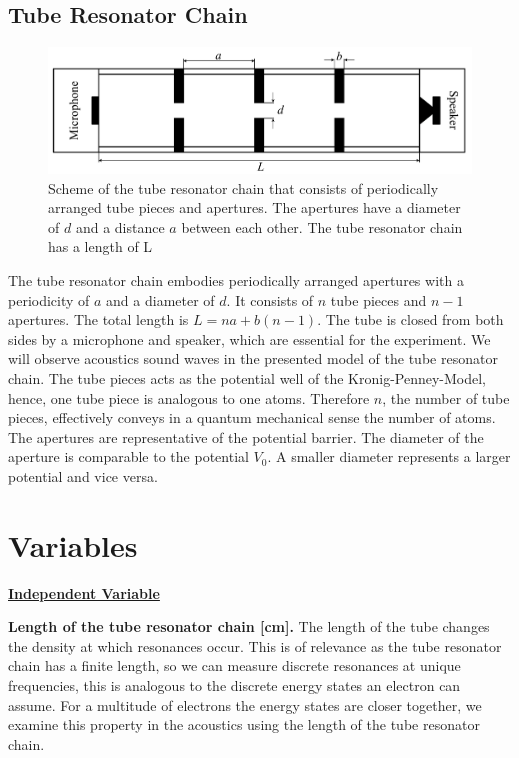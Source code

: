 \documentclass[12pt]{article}
\begin{document}
\subsection{Tube Resonator Chain}
\begin{figure}[hbt]
	\caption{Scheme of the tube resonator chain that consists of periodically arranged tube pieces and apertures. The apertures have a diameter of $d$ and a distance $a$ between each other. The tube resonator chain has a length of L}
	\includegraphics[width=\textwidth]{introduction/tube_resonator_chain.pdf}
\end{figure}
The tube resonator chain embodies periodically arranged apertures with a periodicity of $a$ and a diameter of $d$. It consists of $n$ tube pieces and $n-1$ apertures. The total length is $L=na + b(n-1)$. The tube is closed from both sides by a microphone and speaker, which are essential for the experiment. We will observe acoustics sound waves in the presented model of the tube resonator chain. The tube pieces acts as the potential well of the Kronig-Penney-Model, hence, one tube piece is analogous to one atoms. Therefore $n$, the number of tube pieces, effectively conveys in a quantum mechanical sense the number of atoms. The apertures are representative of the potential barrier. The diameter of the aperture is comparable to the potential $V_0$. A smaller diameter represents a larger potential and vice versa. 

\section{Variables}
\underline{\bf Independent Variable}

{\bf Length of the tube resonator chain [cm].} The length of the tube changes the density at which resonances occur. This is of relevance as the tube resonator chain has a finite length, so we can measure discrete resonances at unique frequencies, this is analogous to the discrete energy states an electron can assume. For a multitude of electrons the energy states are closer together, we examine this property in the acoustics using the length of the tube resonator chain.
\end{document}

